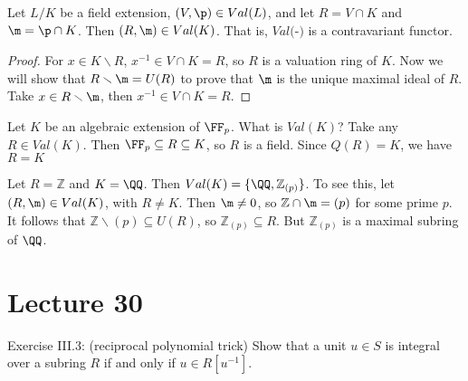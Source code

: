  \begin{proposition}
   Let $L/K$ be a field extension, $(V,\p)\in Val(L)$, and let $R=V\cap K$ and
   $\m=\p\cap K$. Then $(R,\m)\in Val(K)$. That is, $Val($-$)$ is a contravariant functor.
 \end{proposition}
 \begin{proof}
   For $x\in K\smallsetminus R$, $x^{-1}\in V\cap K=R$, so $R$ is a valuation ring of
   $K$. Now we will show that $R\smallsetminus \m = U(R)$ to prove that $\m$ is the
   unique maximal ideal of $R$. Take $x\in R\smallsetminus \m$, then $x^{-1}\in V\cap
   K=R$.
 \end{proof}
 \begin{example}
   Let $K$ be an algebraic extension of $\FF_p$. What is $Val(K)$? Take any $R\in
   Val(K)$. Then $\FF_p\subseteq R \subseteq K$, so $R$ is a field. Since $Q(R)=K$, we
   have $R=K$
 \end{example}
 \begin{example}
   Let $R=\mathbb{Z}$ and $K=\QQ$. Then $Val(K)=\{\QQ, \mathbb{Z}_{(p)}\}$. To see this, let $(R,\m)\in
   Val(K)$, with $R\neq K$. Then $\m\neq 0$, so $\mathbb{Z}\cap \m=(p)$ for some prime $p$. It
   follows that $\mathbb{Z}\smallsetminus (p)\subseteq U(R)$, so $\mathbb{Z}_{(p)}\subseteq R$. But
   $\mathbb{Z}_{(p)}$ is a maximal subring of $\QQ$.
 \end{example}
 
 \setcounter{lecture}{30}
 \section{Lecture 30}

Exercise III.3: (reciprocal polynomial trick) Show that a unit $u\in S$ is integral over
a subring $R$ if and only if $u\in R[u^{-1}]$.

